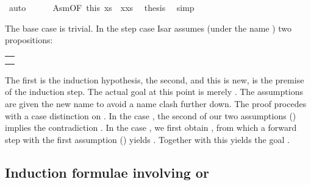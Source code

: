 \begin{isabellebody}
\ auto\isanewline
\ \ \ \ \isamarkupfalse%
\ Asm{\isacharparenleft}{}{\isacharparenright}{\isacharbrackleft}OF\ this{\isacharbrackright}\ {\isacharbackquoteopen}xs\ {\isacharequal}\ x{\isacharhash}xs{\isacharprime}{\isacharbackquoteclose}\ \isamarkupfalse%
\ {\isacharquery}thesis\ \isamarkupfalse%
\ simp\isanewline
\ \ \isamarkupfalse%
\isanewline
{}\isamarkupfalse%
%
\endisatagproof
{\isafoldproof}%
%
\isadelimproof
%
\endisadelimproof
%
\begin{isamarkuptext}%
\noindent
The base case is trivial. In the step case Isar assumes
(under the name ) two propositions:
\begin{center}
\begin{tabular}{l}
\isa{map\ f\ {\isacharquery}xs\ {\isacharequal}\ map\ f\ ys\ {\isasymLongrightarrow}\ length\ {\isacharquery}xs\ {\isacharequal}\ length\ ys}\\
\isa{map\ f\ xs\ {\isacharequal}\ map\ f\ {\isacharparenleft}y\ {\isacharhash}\ ys{\isacharparenright}}
\end{tabular}
\end{center}
The first is the induction hypothesis, the second, and this is new,
is the premise of the induction step. The actual goal at this point is merely
. The assumptions are given the new name
 to avoid a name clash further down. The proof procedes with a case distinction on . In the case , the second of our two
assumptions () implies the contradiction .
 In the case , we first obtain
, from which a forward step with the first assumption () yields . Together
with  this yields the goal
.


\subsection{Induction formulae involving \isa{{\isasymAnd}} or \isa{{\isasymLongrightarrow}}}


\end{isamarkuptext}
\end{isabellebody}
